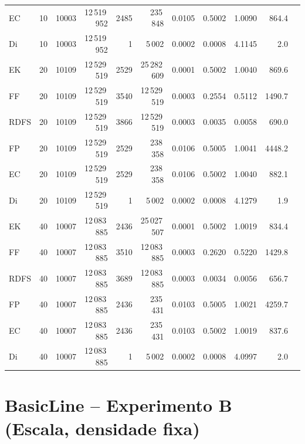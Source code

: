 \documentclass{infufrgs}
\begin{document}
\begin{table}[H]
{\begin{tabular}{llrrrrrrrrr}
EC   & 10 & 10003 & 12\,519\,952 & 2485 & 235\,848      & 0.0105 & 0.5002 & 1.0090 &   864.4 \\
Di   & 10 & 10003 & 12\,519\,952 &    1 & 5\,002        & 0.0002 & 0.0008 & 4.1145 &     2.0 \\
\midrule
EK   & 20 & 10109 & 12\,529\,519 & 2529 & 25\,282\,609 & 0.0001 & 0.5002 & 1.0040 &   869.6 \\
FF   & 20 & 10109 & 12\,529\,519 & 3540 & 12\,529\,519 & 0.0003 & 0.2554 & 0.5112 &  1490.7 \\
RDFS & 20 & 10109 & 12\,529\,519 & 3866 & 12\,529\,519 & 0.0003 & 0.0035 & 0.0058 &   690.0 \\
FP   & 20 & 10109 & 12\,529\,519 & 2529 & 238\,358      & 0.0106 & 0.5005 & 1.0041 &  4448.2 \\
EC   & 20 & 10109 & 12\,529\,519 & 2529 & 238\,358      & 0.0106 & 0.5002 & 1.0040 &   882.1 \\
Di   & 20 & 10109 & 12\,529\,519 &    1 & 5\,002        & 0.0002 & 0.0008 & 4.1279 &     1.9 \\
\midrule
EK   & 40 & 10007 & 12\,083\,885 & 2436 & 25\,027\,507 & 0.0001 & 0.5002 & 1.0019 &   834.4 \\
FF   & 40 & 10007 & 12\,083\,885 & 3510 & 12\,083\,885 & 0.0003 & 0.2620 & 0.5220 &  1429.8 \\
RDFS & 40 & 10007 & 12\,083\,885 & 3689 & 12\,083\,885 & 0.0003 & 0.0034 & 0.0056 &   656.7 \\
FP   & 40 & 10007 & 12\,083\,885 & 2436 & 235\,431      & 0.0103 & 0.5005 & 1.0021 &  4259.7 \\
EC   & 40 & 10007 & 12\,083\,885 & 2436 & 235\,431      & 0.0103 & 0.5002 & 1.0019 &   837.6 \\
Di   & 40 & 10007 & 12\,083\,885 &    1 & 5\,002        & 0.0002 & 0.0008 & 4.0997 &     2.0 \\
\bottomrule
\end{tabular}}
\end{table}

\section{BasicLine -- Experimento B (Escala, densidade fixa)}
\end{document}

